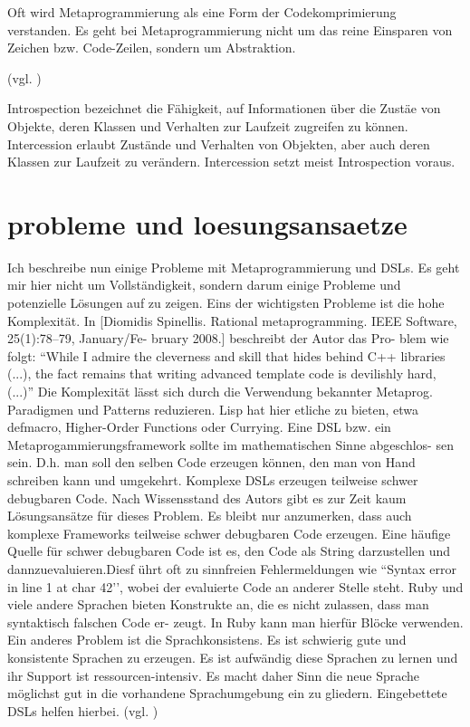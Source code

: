 \documentclass[11pt,english,ngerman, headsepline]{scrreprt}
\begin{document}
Oft wird Metaprogrammierung als eine Form der Codekomprimierung verstanden. Es
geht bei Metaprogrammierung nicht um das reine Einsparen von Zeichen bzw. Code-Zeilen, sondern um Abstraktion.

(vgl. \cite{biekermetaprogrammierung})

Introspection bezeichnet die Fähigkeit, auf Informationen über die Zustäe
von Objekte, deren Klassen und Verhalten zur Laufzeit zugreifen zu können.
Intercession erlaubt Zustände und Verhalten von Objekten, aber auch deren
Klassen zur Laufzeit zu verändern. Intercession setzt meist Introspection
voraus.\cite{mpInGroovy}

\section{probleme und loesungsansaetze} 
Ich beschreibe nun einige Probleme mit Metaprogrammierung und DSLs. Es geht mir
hier nicht um Vollständigkeit, sondern darum einige Probleme und potenzielle
Lösungen auf zu zeigen.
Eins der wichtigsten Probleme ist die hohe Komplexität. In [Diomidis Spinellis.
Rational metaprogramming. IEEE Software, 25(1):78–79, January/Fe- bruary 2008.]
beschreibt der Autor das Pro- blem wie folgt:
“While I admire the cleverness and skill that hides behind C++ libraries (...),
the fact remains that writing advanced template code is devilishly hard, (...)”
Die Komplexität lässt sich durch die Verwendung bekannter Metaprog. Paradigmen
und Patterns reduzieren. Lisp hat hier etliche zu bieten, etwa defmacro,
Higher-Order Functions oder Currying.
Eine DSL bzw. ein Metaprogammierungsframework sollte im mathematischen Sinne
abgeschlos- sen sein. D.h. man soll den selben Code erzeugen können, den man von
Hand schreiben kann und umgekehrt.
Komplexe DSLs erzeugen teilweise schwer debugbaren Code. Nach Wissensstand des
Autors gibt es zur Zeit kaum Lösungsansätze für dieses Problem.
Es bleibt nur anzumerken, dass auch komplexe Frameworks teilweise schwer
debugbaren Code erzeugen.
Eine häufige Quelle für schwer debugbaren Code ist es, den Code als String
darzustellen und dannzuevaluieren.Diesf ührt oft zu sinnfreien Fehlermeldungen
wie “Syntax error in line 1 at char 42’’, wobei der evaluierte Code an anderer
Stelle steht. Ruby und viele andere Sprachen bieten Konstrukte an, die es nicht
zulassen, dass man syntaktisch falschen Code er- zeugt. In Ruby kann man hierfür
Blöcke verwenden.
Ein anderes Problem ist die Sprachkonsistens. Es ist schwierig gute und
konsistente Sprachen zu erzeugen. Es ist aufwändig diese Sprachen zu lernen und
ihr Support ist ressourcen-intensiv. Es macht daher Sinn die neue Sprache
möglichst gut in die vorhandene Sprachumgebung ein zu gliedern. Eingebettete
DSLs helfen hierbei.
(vgl. \cite{biekermetaprogrammierung})
\end{document}
